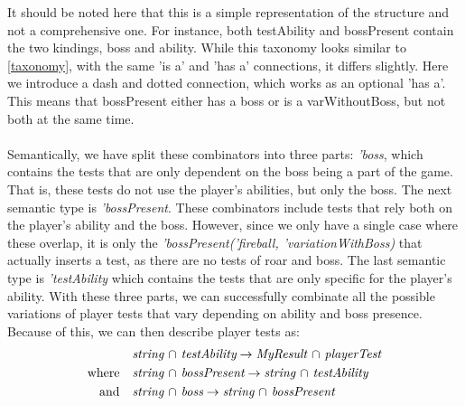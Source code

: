 It should be noted here that this is a simple representation of the structure and not a comprehensive one. For instance, both testAbility and bossPresent contain the two kindings, boss and ability. While this taxonomy looks similar to \autoref{taxonomy}, with the same 'is a' and 'has a' connections, it differs slightly. Here we introduce a dash and dotted connection, which works as an optional 'has a'. This means that bossPresent either has a boss or is a varWithoutBoss, but not both at the same time. \\
\\ 
Semantically, we have split these combinators into three parts: \textit{'boss}, which contains the tests that are only dependent on the boss being a part of the game. That is, these tests do not use the player's abilities, but only the boss. The next semantic type is \textit{'bossPresent}. These combinators include tests that rely both on the player's ability and the boss. However, since we only have a single case where these overlap, it is only the \textit{'bossPresent('fireball, 'variationWithBoss)} that actually inserts a test, as there are no tests of roar and boss. The last semantic type is \textit{'testAbility} which contains the tests that are only specific for the player's ability. With these three parts, we can successfully combinate all the possible variations of player tests that vary depending on ability and boss presence. Because of this, we can then describe player tests as: 
\begin{align*}
	&\textit{string $\cap$ testAbility} \to \textit{MyResult $\cap$ playerTest} \\
	\text{where\quad} &\textit{string $\cap$ bossPresent} \to \textit{string $\cap$ testAbility} \\
	\text{and\quad} &\textit{string $\cap$ boss} \to \textit{string $\cap$ bossPresent}
\end{align*}
